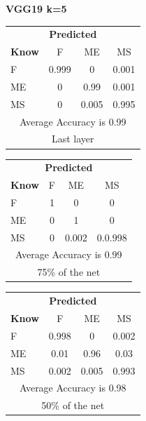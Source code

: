 \documentclass[12pt]{article} %
\begin{document}
\begin{center}
\textbf{ VGG19 k=5}
\end{center}
\begin{minipage}{0.5\textwidth}
\begin{center}
\begin{tabular}{l|c|c|c|}
 \multicolumn{4}{c}{ \textbf{ Predicted}}\\
 \textbf{Know}&F&ME&MS\\ \hline\hline
F   &0.999&0&0.001\\
ME &0&0.99&0.001\\
MS &0&0.005&0.995\\
\multicolumn{4}{c}{Average Accuracy is 0.99}\\
\multicolumn{4}{c}{Last layer}\\
\end{tabular}
\end{center}
\end{minipage}
\begin{minipage}{0.5\textwidth}
\begin{center}
\begin{tabular}{l|c|c|c|}
 \multicolumn{4}{c}{ \textbf{ Predicted}}\\
 \textbf{Know}&F&ME&MS\\ \hline\hline
F   &1&0&0\\
ME &0&1&0\\
MS &0&0.002&0.0.998\\
\multicolumn{4}{c}{Average Accuracy is 0.99}\\
\multicolumn{4}{c}{75\%  of the net}\\
\end{tabular}
\end{center}
\end{minipage}
\begin{minipage}{0.5\textwidth}
\begin{center}
\begin{tabular}{l|c|c|c|}
 \multicolumn{4}{c}{ \textbf{ Predicted}}\\
 \textbf{Know}&F&ME&MS\\ \hline\hline
F   &0.998&0&0.002\\
ME &0.01&0.96&0.03\\
MS &0.002&0.005&0.993\\
\multicolumn{4}{c}{Average Accuracy is 0.98}\\
\multicolumn{4}{c}{50\%  of the net}\\
\end{tabular}
\end{center}
\end{minipage}
\end{document}
